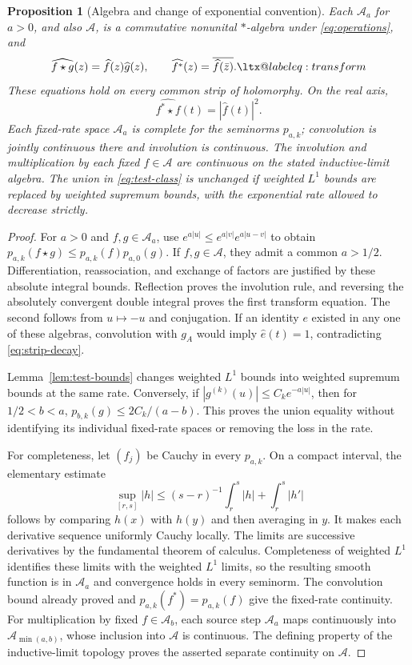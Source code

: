 \documentclass[11pt]{article}
\makeatletter
\newtheorem{proposition}[theorem]{Proposition}
\theoremstyle{definition}
\theoremstyle{remark}
\numberwithin{equation}{section}
\newcommand{\A}{\mathcal A}
\newcommand{\alsoeq}[1]{\ltx@label{#1}}
\makeatother
\begin{document}
\begin{proposition}[Algebra and change of exponential convention]
\label{prop:algebra}
Each $\A_a$ for $a>0$, and also $\A$, is a commutative nonunital
$*$-algebra under \eqref{eq:operations}, and
\begin{equation}
 \widehat{f\star g}(z)=\widehat f(z)\widehat g(z),\qquad
 \widehat{f^*}(z)=\overline{\widehat f(\bar z)}.
 \label{eq:star-transform}\alsoeq{eq:transform}
\end{equation}
These equations hold on every common strip of holomorphy.  On the real axis,
\begin{equation}
 \widehat{f^*\star f}(t)=|\widehat f(t)|^2.
 \label{eq:square-transform}
\end{equation}
Each fixed-rate space $\A_a$ is complete for the seminorms $p_{a,k}$;
convolution is jointly continuous there and involution is continuous.
The involution and multiplication by each fixed $f\in\A$ are continuous
on the stated inductive-limit algebra.
The union in \eqref{eq:test-class} is unchanged if weighted $L^1$ bounds
are replaced by weighted supremum bounds, with the exponential rate allowed
to decrease strictly.
\end{proposition}

\begin{proof}
For $a>0$ and $f,g\in\A_a$, use
$e^{a|u|}\leq e^{a|v|}e^{a|u-v|}$ to obtain
$p_{a,k}(f\star g)\leq p_{a,k}(f)p_{a,0}(g)$.
If $f,g\in\A$, they admit a common $a>1/2$.
Differentiation, reassociation, and exchange of factors are justified by
these absolute integral bounds.  Reflection proves the involution rule,
and reversing the absolutely convergent double integral proves the first
transform equation.  The second follows from $u\mapsto-u$ and conjugation.
If an identity $e$ existed in any one of these algebras, convolution with
$g_A$ would imply $\widehat e(t)=1$, contradicting \eqref{eq:strip-decay}.

Lemma~\ref{lem:test-bounds} changes weighted $L^1$ bounds into weighted
supremum bounds at the same rate.  Conversely, if
$|g^{(k)}(u)|\leq C_k e^{-a|u|}$, then for $1/2<b<a$,
$p_{b,k}(g)\leq2C_k/(a-b)$.
This proves the union equality without identifying its individual fixed-rate
spaces or removing the loss in the rate.

For completeness, let $(f_j)$ be Cauchy in every $p_{a,k}$.
On a compact interval, the elementary estimate
\[
 \sup_{[r,s]}|h|\leq (s-r)^{-1}\int_r^s|h|+\int_r^s|h'|
\]
follows by comparing $h(x)$ with $h(y)$ and then averaging in $y$.
It makes each derivative sequence uniformly Cauchy locally.
The limits are successive derivatives by the fundamental theorem of
calculus.  Completeness of weighted $L^1$ identifies these limits with
the weighted $L^1$ limits, so the resulting smooth function is in
$\A_a$ and convergence holds in every seminorm.
The convolution bound already proved and
$p_{a,k}(f^*)=p_{a,k}(f)$ give the fixed-rate continuity.
For multiplication by fixed $f\in\A_b$, each source step $\A_a$
maps continuously into $\A_{\min(a,b)}$, whose inclusion into $\A$
is continuous.  The defining property of the inductive-limit topology
proves the asserted separate continuity on $\A$.
\end{proof}
\end{document}
